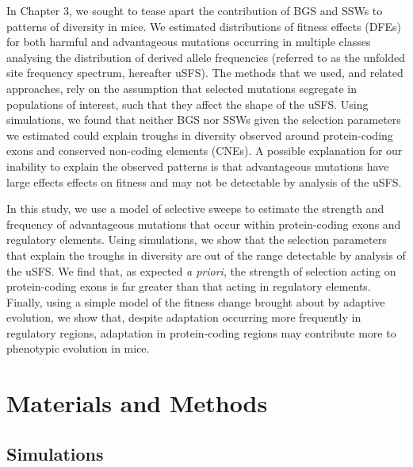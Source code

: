 In Chapter 3, we sought to tease apart the contribution of BGS and SSWs to patterns of diversity in mice. We estimated distributions of fitness effects (DFEs) for both harmful and advantageous mutations occurring in multiple classes analysing the distribution of derived allele frequencies (referred to as the unfolded site frequency spectrum, hereafter uSFS). The methods that we used, and related approaches, rely on the assumption that selected mutations segregate in populations of interest, such that they affect the shape of the uSFS. Using simulations, we found that neither BGS nor SSWs given the selection parameters we estimated could explain troughs in diversity observed around protein-coding exons and conserved non-coding elements (CNEs). A possible explanation for our inability to explain the observed patterns is that advantageous mutations have large effects effects on fitness and may not be detectable by analysis of the uSFS. 

In this study, we use a model of selective sweeps to estimate the strength and frequency of advantageous mutations that occur within protein-coding exons and regulatory elements. Using simulations, we show that the selection parameters that explain the troughs in diversity are out of the range detectable by analysis of the uSFS.  We find that, as expected \textit{a priori}, the strength of selection acting on protein-coding exons is far greater than that acting in regulatory elements. Finally, using a simple model of the fitness change brought about by adaptive evolution, we show that, despite adaptation occurring more frequently in regulatory regions, adaptation in protein-coding regions may contribute more to phenotypic evolution in mice.

%
%
\section*{Materials and Methods}


	\subsection*{Simulations}
	
